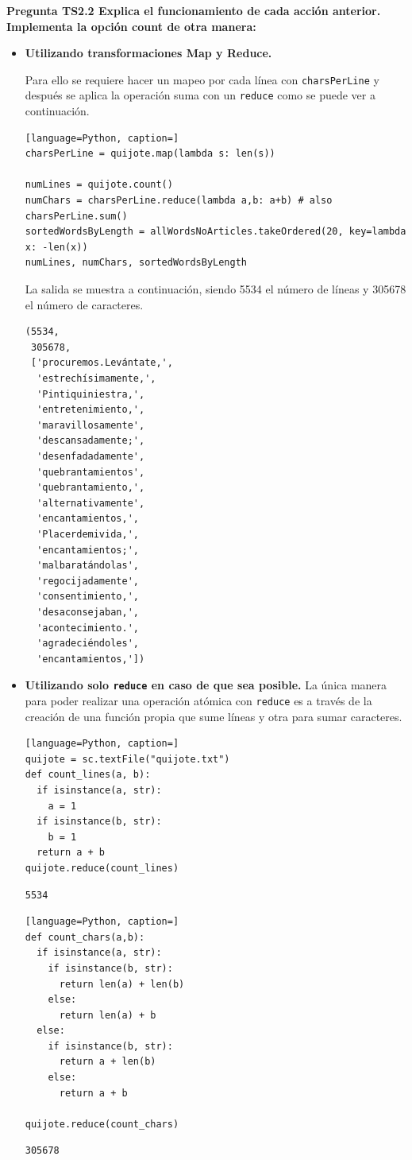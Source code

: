 \documentclass[10pt,swedish, openany]{book}
\begin{document}
\textbf{Pregunta TS2.2 Explica el funcionamiento de cada acción anterior.}
\textbf{Implementa la opción count de otra manera:}
\begin{itemize}
    \item \textbf{Utilizando transformaciones Map y Reduce.}
    
    Para ello se requiere hacer un mapeo por cada línea con \texttt{charsPerLine} y después se aplica la operación suma con un \texttt{reduce} como se puede ver a continuación.
    
    \begin{lstlisting}[language=Python, caption=]
charsPerLine = quijote.map(lambda s: len(s))

numLines = quijote.count()
numChars = charsPerLine.reduce(lambda a,b: a+b) # also charsPerLine.sum()
sortedWordsByLength = allWordsNoArticles.takeOrdered(20, key=lambda x: -len(x))
numLines, numChars, sortedWordsByLength
    \end{lstlisting}
    La salida se muestra a continuación, siendo 5534 el número de líneas y 305678 el número de caracteres.
    \begin{verbatim}
(5534,
 305678,
 ['procuremos.Levántate,',
  'estrechísimamente,',
  'Pintiquiniestra,',
  'entretenimiento,',
  'maravillosamente',
  'descansadamente;',
  'desenfadadamente',
  'quebrantamientos',
  'quebrantamiento,',
  'alternativamente',
  'encantamientos,',
  'Placerdemivida,',
  'encantamientos;',
  'malbaratándolas',
  'regocijadamente',
  'consentimiento,',
  'desaconsejaban,',
  'acontecimiento.',
  'agradeciéndoles',
  'encantamientos,'])
    \end{verbatim}
    
    \item \textbf{Utilizando solo \texttt{reduce} en caso de que sea posible.}
    La única manera para poder realizar una operación atómica con \texttt{reduce} es a través de la creación de una función propia que sume líneas y otra para sumar caracteres.
    
\begin{lstlisting}[language=Python, caption=]
quijote = sc.textFile("quijote.txt")
def count_lines(a, b):
  if isinstance(a, str):
    a = 1
  if isinstance(b, str):
    b = 1
  return a + b
quijote.reduce(count_lines)
\end{lstlisting}
\begin{verbatim}
5534
\end{verbatim}

\begin{lstlisting}[language=Python, caption=]
def count_chars(a,b):
  if isinstance(a, str):
    if isinstance(b, str):
      return len(a) + len(b)
    else:
      return len(a) + b 
  else:
    if isinstance(b, str):
      return a + len(b)
    else:
      return a + b
  
quijote.reduce(count_chars)
\end{lstlisting}
\begin{verbatim}
305678
\end{verbatim}
    
\end{itemize}
\end{document}
